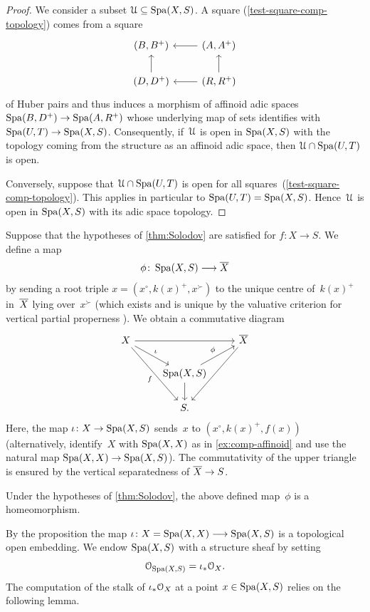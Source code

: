 \begin{proof}
    We consider a subset ${\mathcal U} \subseteq \operatorname{Spa}(X,S)$.
    A square (\ref{test-square-comp-topology}) comes from a square
    \[
        \begin{tikzcd}
            (B,B^+)         & (A,A^+) \ar[l]    \\
            (D,D^+) \ar[u]  & (R,R^+) \ar[l] \ar[u]
        \end{tikzcd}
    \]
    of Huber pairs and thus induces a morphism of affinoid adic spaces $\operatorname{Spa}(B,D^+) \to \operatorname{Spa}(A,R^+)$ whose underlying map of sets identifies with $\operatorname{Spa}(U,T) \to \operatorname{Spa}(X,S)$.
    Consequently, if~${\mathcal U}$ is open in $\operatorname{Spa}(X,S)$ with the topology coming from the structure as an affinoid adic space, then ${\mathcal U} \cap \operatorname{Spa}(U,T)$ is open.

    Conversely, suppose that ${\mathcal U} \cap \operatorname{Spa}(U,T)$ is open for all squares~(\ref{test-square-comp-topology}).
    This applies in particular to $\operatorname{Spa}(U,T) = \operatorname{Spa}(X,S)$.
    Hence~${\mathcal U}$ is open in $\operatorname{Spa}(X,S)$ with its adic space topology.
\end{proof}

Suppose that the hypotheses of \cref{thm:Solodov} are satisfied for $f \colon X \to S$.
We define a map
\[
    \phi \colon \operatorname{Spa}(X,S) \longrightarrow \overline{X}
\]
by sending a root triple $x = (x^\circ,k(x)^+,x^\succ)$ to the unique centre of~$k(x)^+$ in~$\overline{X}$ lying over~$x^\succ$ (which exists and is unique by the valuative criterion for vertical partial properness \cite{Bauer:valuative-criteria}).
We obtain a commutative diagram
\[
 \begin{tikzcd}
     X  \ar[rr] \ar[dr,"\iota"]  \ar[ddr,"f"']   &           & \ov X \ar[ddl]    \\
     & \Spa(X,S) \ar[d]  \ar[ur,"\phi"] \\
     & S.
 \end{tikzcd}
\]
Here, the map $\iota \colon X \to \operatorname{Spa}(X,S)$ sends~$x$ to $(x^\circ,k(x)^+,f(x))$ (alternatively, identify~$X$ with $\operatorname{Spa}(X,X)$ as in \cref{ex:comp-affinoid} and use the natural map $\operatorname{Spa}(X,X) \to \operatorname{Spa}(X,S)$).
The commutativity of the upper triangle is ensured by the vertical separatedness of $\overline{X} \to S$.


\begin{prop} \label{prop:comp-homeo}
    Under the hypotheses of \cref{thm:Solodov}, the above defined map~$\phi$ is a homeomorphism.
\end{prop}

By the proposition the map
$\iota \colon X = \operatorname{Spa}(X,X) \longrightarrow \operatorname{Spa}(X,S)$ is a topological open embedding.
We endow $\operatorname{Spa}(X,S)$ with a structure sheaf by setting 
\[
{\mathcal O}_{\operatorname{Spa}(X,S)} = \iota_* {\mathcal O}_X.
\]
The computation of the stalk of $\iota_*{\mathcal O}_X$ at a point $x \in \operatorname{Spa}(X,S)$ relies on the following lemma.

